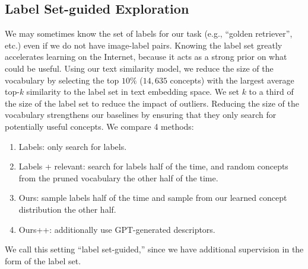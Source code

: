 \subsection{Label Set-guided Exploration}
We may sometimes know the set of labels for our task (e.g., ``golden retriever'', etc.) even if we do not have image-label pairs. 
Knowing the label set greatly accelerates learning on the Internet, because it acts as a strong prior on what could be useful. 
Using our text similarity model, we reduce the size of the vocabulary by selecting the top 
$10\%$ ($14{,}635$ concepts)
with the largest average top-$k$ similarity to the label set in text embedding space. We set $k$ to a third of the size of the label set to reduce the impact of outliers. Reducing the size of the vocabulary strengthens our baselines by ensuring that they only search for potentially useful concepts. We compare 4 methods:   
\begin{enumerate}[noitemsep,topsep=0pt]
    \item Labels: only search for labels. 
    \item Labels + relevant: search for labels half of the time, and random concepts from the pruned vocabulary the other half of the time. 
    \item Ours: sample labels half of the time and sample from our learned concept distribution the other half. 
    \item Ours++: additionally use GPT-generated descriptors.
\end{enumerate}
We call this setting ``label set-guided,'' since we have additional supervision in the form of the label set.

